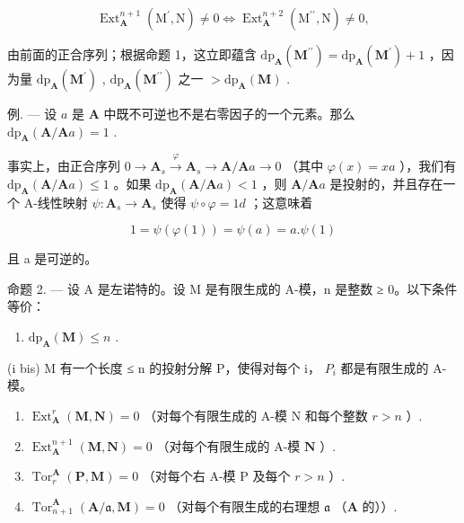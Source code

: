 \[
\operatorname{Ext} _ {\mathbf {A}} ^ {n + 1} \left(\mathrm{M} ^ {\prime}, \mathrm{N}\right) \neq 0 \Leftrightarrow \operatorname{Ext} _ {\mathbf {A}} ^ {n + 2} \left(\mathrm{M} ^ {\prime \prime}, \mathrm{N}\right) \neq 0,
\]

由前面的正合序列；根据命题 1，这立即蕴含 \(\mathrm{dp}_{\mathbf{A}}(\mathbf{M}^{\prime \prime}) = \mathrm{dp}_{\mathbf{A}}(\mathbf{M}^{\prime}) + 1\) ，因为量 \(\mathrm{dp}_{\mathbf{A}}(\mathbf{M}^{\prime})\) , \(\mathrm{dp}_{\mathbf{A}}(\mathbf{M}^{\prime \prime})\) 之一 \(> \mathrm{dp}_{\mathbf{A}}(\mathbf{M})\) .

例. --- 设 \(a\) 是 \(\mathbf{A}\) 中既不可逆也不是右零因子的一个元素。那么 \(\mathrm{dp}_{\mathbf{A}}(\mathbf{A}/\mathbf{A}a)=1\) .

事实上，由正合序列 \(0 \to \mathbf{A}_s \xrightarrow{\varphi} \mathbf{A}_s \to \mathbf{A} / \mathbf{A}a \to 0\) （其中 \(\varphi(x) = xa\) ），我们有 \(\mathrm{dp}_{\mathbf{A}}(\mathbf{A} / \mathbf{A}a) \leqslant 1\) 。如果 \(\mathrm{dp}_{\mathbf{A}}(\mathbf{A} / \mathbf{A}a) < 1\) ，则 \(\mathbf{A} / \mathbf{A}a\) 是投射的，并且存在一个 A-线性映射 \(\psi : \mathbf{A}_s \to \mathbf{A}_s\) 使得 \(\psi \circ \varphi = 1d\) ；这意味着

\[
1 = \psi (\varphi (1)) = \psi (a) = a. \psi (1)
\]

且 a 是可逆的。

命题 2. --- 设 A 是左诺特的。设 M 是有限生成的 A-模，n 是整数 ≥ 0。以下条件等价：

\begin{enumerate}
\def\labelenumi{(\roman{enumi})}
\tightlist
\item
  \(\mathrm{dp}_{\mathbf{A}}(\mathbf{M}) \leqslant n\) .
\end{enumerate}

(i bis) M 有一个长度 ≤ n 的投射分解 P，使得对每个 i， \(P_{i}\) 都是有限生成的 A-模。

\begin{enumerate}
\def\labelenumi{(\roman{enumi})}
\setcounter{enumi}{1}
\item
  \(\operatorname{Ext}_{\mathbf{A}}^{r}(\mathbf{M},\mathbf{N}) = 0\) （对每个有限生成的 A-模 N 和每个整数 \(r > n\) ）.
\item
  \(\operatorname{Ext}_{\mathbf{A}}^{n+1}(\mathbf{M}, \mathbf{N}) = 0\) （对每个有限生成的 A-模 \(\mathbf{N}\) ）.
\item
  \(\operatorname{Tor}_r^{\mathbf{A}}(\mathbf{P},\mathbf{M}) = 0\) （对每个右 A-模 P 及每个 \(r > n\) ）.
\item
  \(\operatorname{Tor}_{n+1}^{\mathbf{A}}(\mathbf{A}/\mathfrak{a},\mathbf{M}) = 0\) （对每个有限生成的右理想 \(\mathfrak{a}\) （\(\mathbf{A}\) 的））.
\end{enumerate}

